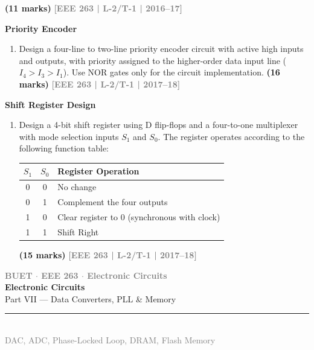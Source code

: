 \documentclass[12pt,a3paper]{article}
\newcommand{\yr}[1]{\hfill\textcolor{gray}{\small\textbf{[#1]}}}
\newcommand{\mk}[1]{\textcolor{orange!70!black}{\small\textbf{(#1 marks)}}}
\newcommand{\subtopic}[2]{%
  \vspace{10pt}
  \noindent\begin{tcolorbox}[colback=#1!8,colframe=#1,boxrule=0.6pt,arc=4pt,
    left=6pt,right=6pt,top=4pt,bottom=4pt]
    \small\bfseries\textcolor{#1}{#2}
  \end{tcolorbox}
  \vspace{2pt}
}
\newcommand{\secdivider}[3]{%
  \newpage\thispagestyle{empty}%
  \vspace*{\fill}%
  \begin{tcolorbox}[enhanced,colback=#3!6,colframe=#3,boxrule=1.5pt,arc=8pt,
    left=20pt,right=20pt,top=22pt,bottom=22pt,
    shadow={3pt}{-3pt}{0pt}{black!15}]
    \centering
    {\large\textcolor{gray}{\textbf{BUET $\cdot$ EEE 263 $\cdot$ Electronic Circuits}}}\\[8pt]
    {\fontsize{26}{32}\selectfont\bfseries\textcolor{#3}{Electronic Circuits}}\\[6pt]
    {\fontsize{15}{19}\selectfont\textcolor{dgray}{#1}}\\[12pt]
    \textcolor{#3!60}{\rule{0.5\textwidth}{0.5pt}}\\[6pt]
    {\small\textcolor{gray}{#2}}
  \end{tcolorbox}%
  \vspace*{\fill}\newpage%
}
\begin{document}
\begin{enumerate}
\begin{center}
\end{center}

\mk{11} \yr{EEE 263 | L-2/T-1 | 2016--17}

\end{enumerate}

\subtopic{cD}{Priority Encoder}
\label{sub:s9-encoder}

\begin{enumerate}\item Design a four-line to two-line priority encoder circuit with active high inputs and outputs, with priority assigned to the higher-order data input line ($I_4 > I_3 > I_1$). Use NOR gates only for the circuit implementation.
\mk{16} \yr{EEE 263 | L-2/T-1 | 2017--18}

\end{enumerate}

\subtopic{cD}{Shift Register Design}
\label{sub:s9-shift}

\begin{enumerate}\item Design a 4-bit shift register using D flip-flops and a four-to-one multiplexer with mode selection inputs $S_1$ and $S_0$. The register operates according to the following function table:
\begin{center}
\begin{tabular}{ccl}
\toprule
$S_1$ & $S_0$ & \textbf{Register Operation} \\
\midrule
0 & 0 & No change \\
0 & 1 & Complement the four outputs \\
1 & 0 & Clear register to 0 (synchronous with clock) \\
1 & 1 & Shift Right \\
\bottomrule
\end{tabular}
\end{center}
\mk{15} \yr{EEE 263 | L-2/T-1 | 2017--18}

\end{enumerate}

\secdivider{Part VII --- Data Converters, PLL \& Memory}{DAC, ADC, Phase-Locked Loop, DRAM, Flash Memory}{cH}
\end{document}
